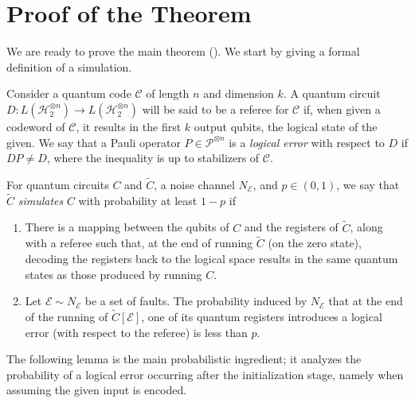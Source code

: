 







\section{Proof of the Theorem}

We are ready to prove the main theorem (). We start by giving a formal definition of a simulation.

  \begin{definition}
    \label{def:simu}
    Consider a quantum code $\mathcal{C}$ of length $n$ and dimension $k$. A quantum circuit $D \colon L(\mathcal{H}_{2}^{\otimes n}) \rightarrow L(\mathcal{H}_{2}^{\otimes n})$ will be said to be a referee for $\mathcal{C}$ if, when given a codeword of $\mathcal{C}$, it results in the first $k$ output qubits, the logical state of the given. We say that a Pauli operator $P \in \mathcal{P}^{\otimes n}$ is a \textit{logical error} with respect to $D$ if $DP \neq D$, where the inequality is up to stabilizers of $\mathcal{C}$.

For quantum circuits $C$ and $\tilde{C}$, a noise channel $N_{\mathcal{E}}$, and $p \in (0,1)$, we say that $\tilde{C}$ \textit{simulates} $C$ with probability at least $1 - p$ if
    \begin{enumerate}
      \item
        There is a mapping between the qubits of $C$ and the registers of $\tilde{C}$, along with a referee such that, at the end of running $\tilde{C}$ (on the zero state), decoding the registers back to the logical space results in the same quantum states as those produced by running $C$.
      \item Let $\mathcal{E} \sim N_{\mathcal{E}}$ be a set of faults. The probability induced by $N_{\mathcal{E}}$ that at the end of the running of $\tilde{C}[\mathcal{E}]$, one of its quantum registers introduces a logical error (with respect to the referee) is less than $p$.
    \end{enumerate}
  \end{definition}



The following lemma is the main probabilistic ingredient; it analyzes the probability of a logical error occurring after the initialization stage, namely when assuming the given input is encoded.

